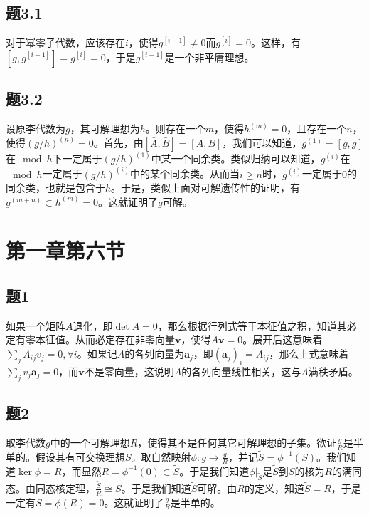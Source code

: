 \documentclass{ctexart}
\begin{document}
	\subsection{题3.1}
	
	对于幂零子代数，应该存在$i$，使得$g^{[i-1]}\neq 0$而$g^{[i]}=0$。这样，有$[g,g^{[i-1]}]=g^{[i]}=0$，于是$g^{[i-1]}$是一个非平庸理想。
	
	\subsection{题3.2}
	
	设原李代数为$g$，其可解理想为$h$。则存在一个$m$，使得$h^{(m)}=0$，且存在一个$n$，使得$(g/h)^{(n)}=0$。首先，由$[\bar A,\bar B]=\overline{[A,B]}$，我们可以知道，$g^{(1)}=[g,g]$在$\mod h$下一定属于$(g/h)^{(1)}$中某一个同余类。类似归纳可以知道，$g^{(i)}$在$\mod h$一定属于$(g/h)^{(i)}$中的某个同余类。从而当$i\geq n$时，$g^{(i)}$一定属于$0$的同余类，也就是包含于$h$。于是，类似上面对可解遗传性的证明，有$g^{(m+n)}\subset h^{(m)}=0$。这就证明了$g$可解。
	
	\section{第一章第六节}
	
	\subsection{题1}
	
	如果一个矩阵$A$退化，即$\det A=0$，那么根据行列式等于本征值之积，知道其必定有零本征值。从而必定存在非零向量$\mathbf v$，使得$A\mathbf v=0$。展开后这意味着$\sum_j A_{ij}v_j=0,\forall i$。如果记$A$的各列向量为$\mathbf a_j$，即$(\mathbf a_j)_i=A_{ij}$，那么上式意味着$\sum_j v_j\mathbf a_j=0$，而$\mathbf v$不是零向量，这说明$A$的各列向量线性相关，这与$A$满秩矛盾。
	
	\subsection{题2}
	
	取李代数$g$中的一个可解理想$R$，使得其不是任何其它可解理想的子集。欲证$\frac{g}{R}$是半单的。假设其有可交换理想$S$。取自然映射$\phi:g\to\frac{g}{R}$，并记$\tilde S=\phi^{-1}(S)$。我们知道$\ker\phi=R$，而显然$R=\phi^{-1}(0)\subset\tilde S$。于是我们知道$\phi|_{\tilde S}$是$\tilde S$到$S$的核为$R$的满同态。由同态核定理，$\frac{\tilde S}{R}\cong S$。于是我们知道$\tilde S$可解。由$R$的定义，知道$\tilde S=R$，于是一定有$S=\phi(R)=0$。这就证明了$\frac{g}{R}$是半单的。
	
\end{document}
